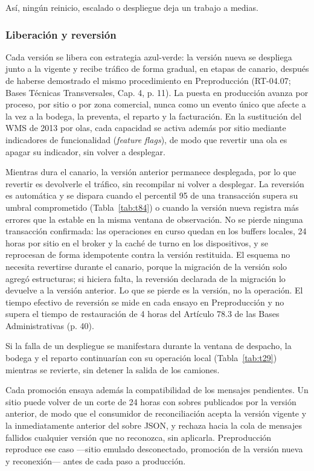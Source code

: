 Así, ningún reinicio, escalado o despliegue deja un trabajo a medias.

\subsubsection{Liberación y reversión}

Cada versión se libera con estrategia azul-verde: la versión nueva se despliega junto a la vigente y recibe tráfico de forma gradual, en etapas de canario, después de haberse demostrado el mismo procedimiento en Preproducción (RT-04.07; Bases Técnicas Transversales, Cap. 4, p. 11). La puesta en producción avanza por proceso, por sitio o por zona comercial, nunca como un evento único que afecte a la vez a la bodega, la preventa, el reparto y la facturación. En la sustitución del WMS de 2013 por olas, cada capacidad se activa además por sitio mediante indicadores de funcionalidad (\emph{feature flags}), de modo que revertir una ola es apagar su indicador, sin volver a desplegar.

Mientras dura el canario, la versión anterior permanece desplegada, por lo que revertir es devolverle el tráfico, sin recompilar ni volver a desplegar. La reversión es automática y se dispara cuando el percentil 95 de una transacción supera su umbral comprometido (Tabla~\ref{tab:t84}) o cuando la versión nueva registra más errores que la estable en la misma ventana de observación. No se pierde ninguna transacción confirmada: las operaciones en curso quedan en los buffers locales, 24 horas por sitio en el broker y la caché de turno en los dispositivos, y se reprocesan de forma idempotente contra la versión restituida. El esquema no necesita revertirse durante el canario, porque la migración de la versión solo agregó estructuras; si hiciera falta, la reversión declarada de la migración lo devuelve a la versión anterior. Lo que se pierde es la versión, no la operación. El tiempo efectivo de reversión se mide en cada ensayo en Preproducción y no supera el tiempo de restauración de 4 horas del Artículo 78.3 de las Bases Administrativas (p. 40).

Si la falla de un despliegue se manifestara durante la ventana de despacho, la bodega y el reparto continuarían con su operación local (Tabla~\ref{tab:t29}) mientras se revierte, sin detener la salida de los camiones.

Cada promoción ensaya además la compatibilidad de los mensajes pendientes. Un sitio puede volver de un corte de 24 horas con sobres publicados por la versión anterior, de modo que el consumidor de reconciliación acepta la versión vigente y la inmediatamente anterior del sobre JSON, y rechaza hacia la cola de mensajes fallidos cualquier versión que no reconozca, sin aplicarla. Preproducción reproduce ese caso ---sitio emulado desconectado, promoción de la versión nueva y reconexión--- antes de cada paso a producción.

